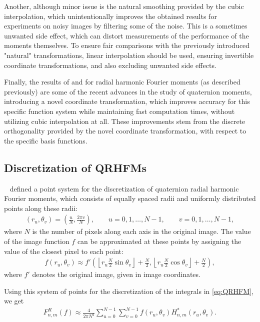 Another, although minor issue is the natural smoothing provided by the cubic interpolation, which unintentionally improves the obtained results for experiments on noisy images by filtering some of the noise. This is a sometimes unwanted side effect, which can distort measurements of the performance of the moments themselves. To ensure fair comparisons with the previously introduced "natural" transformations, linear interpolation should be used, ensuring invertible coordinate transformations, and also excluding unwanted side effects.


Finally, the results of \citeauthor{WangAcc} \cite{WangAcc} and \citeauthor{LiuAcc} \cite{LiuAcc} for radial harmonic Fourier moments (as described previously) are some of the recent advances in the study of quaternion moments, introducing a novel coordinate transformation, which improves accuracy for this specific function system while maintaining fast computation times, without utilizing cubic interpolation at all. These improvements stem from the discrete orthogonality provided by the novel coordinate transformation, with respect to the specific basis functions.


\subsection{Discretization of QRHFMs}
\citeauthor{LiuAcc}~\cite{LiuAcc} defined a point system for the discretization of quaternion radial harmonic Fourier moments, which consists of equally spaced radii and uniformly distributed points along these radii:
\begin{gather*}
    (r_u, \theta_v) = \left(\frac{u}{N}, \frac{2\pi v}{N}\right), \qquad u = 0,1,\ldots ,N - 1, \qquad v = 0,1,\ldots ,N - 1,
\end{gather*}
where $N$ is the number of pixels along each axis in the original image. The value of the image function $f$ can be approximated at these points by assigning the value of the closest pixel to each point:
\begin{gather*}
    f(r_u, \theta_v) \approx f'\left(\left \lfloor r_u\frac{N}{2}\sin \theta_v \right \rfloor + \frac{N}{2}, \left \lfloor r_u\frac{N}{2}\cos \theta_v \right \rfloor + \frac{N}{2}\right),
\end{gather*}
where $f'$ denotes the original image, given in image coordinates.


Using this system of points for the discretization of the integrals in \eqref{eq:QRHFM}, we get
\begin{gather*}
    F_{n,m}^R(f) \approx \frac{4}{2\pi N^2}\sum_{u = 0}^{N-1}\sum_{v = 0}^{N-1}f(r_u, \theta_v)H_{n,m}^*(r_u, \theta_v).
\end{gather*}


